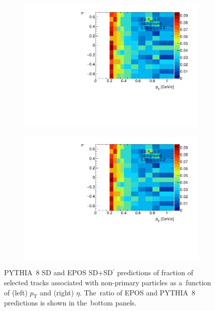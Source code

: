 \begin{figure}[t!]
	\centering
	\begin{subfigure}{.49\textwidth}
		\includegraphics[width=\linewidth, page=8]{chapters/chrgSTAR/img/chargedBkg/bkg2D.pdf}
	\end{subfigure}
	\begin{subfigure}{.49\textwidth}
		\includegraphics[width=\linewidth, page=9]{chapters/chrgSTAR/img/chargedBkg/bkg2D.pdf}
	\end{subfigure}
	\vspace{-0.25cm}
	\caption{PYTHIA~8 SD and EPOS SD+SD$^\prime$ predictions of fraction of selected tracks  associated with non-primary particles  as a~function of (left) $p_\textrm{T}$ and (right) $\eta$. The~ratio of EPOS and PYTHIA~8 predictions is shown in the~bottom panels.}
	\label{fig:bkg_epos_charged_1D}
	\vspace{-0.25cm}
\end{figure}



